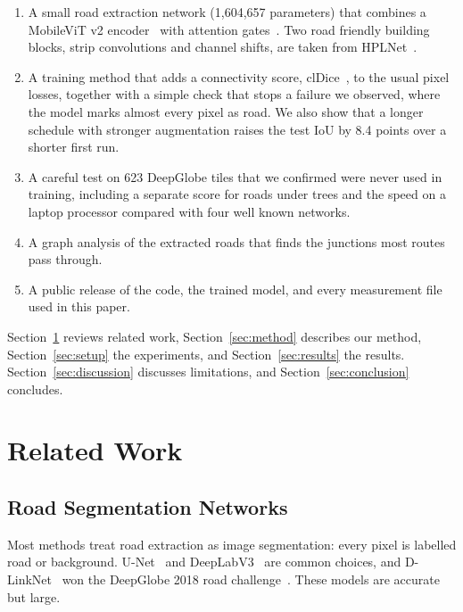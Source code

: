 \documentclass{ieeeaccess}
\begin{document}
\begin{enumerate}

\item A small road extraction network (1,604,657 parameters) that combines a MobileViT v2 encoder~\cite{mehta2023separable} with attention gates~\cite{oktay2018attention}. Two road friendly building blocks, strip convolutions and channel shifts, are taken from HPLNet~\cite{cui2025hplnet}.

\item A training method that adds a connectivity score, clDice~\cite{shit2021cldice}, to the usual pixel losses, together with a simple check that stops a failure we observed, where the model marks almost every pixel as road. We also show that a longer schedule with stronger augmentation raises the test IoU by 8.4 points over a shorter first run.

\item A careful test on 623 DeepGlobe tiles that we confirmed were never used in training, including a separate score for roads under trees and the speed on a laptop processor compared with four well known networks.

\item A graph analysis of the extracted roads that finds the junctions most routes pass through.

\item A public release of the code, the trained model, and every measurement file used in this paper.

\end{enumerate}

Section~\ref{sec:related} reviews related work, Section~\ref{sec:method} describes our method, Section~\ref{sec:setup} the experiments, and Section~\ref{sec:results} the results. Section~\ref{sec:discussion} discusses limitations, and Section~\ref{sec:conclusion} concludes.

\section{Related Work}
\label{sec:related}

\subsection{Road Segmentation Networks}

Most methods treat road extraction as image segmentation: every pixel is labelled road or background. U-Net~\cite{ronneberger2015unet} and DeepLabV3~\cite{chen2017deeplab} are common choices, and D-LinkNet~\cite{zhou2018dlinknet} won the DeepGlobe 2018 road challenge~\cite{demir2018deepglobe}. These models are accurate but large.
\end{document}

